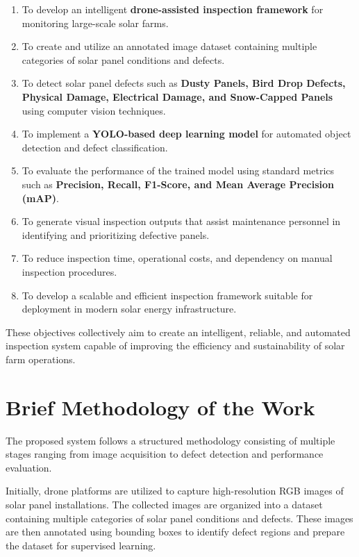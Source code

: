\begin{enumerate}
\item To develop an intelligent \textbf{drone-assisted inspection framework} for monitoring large-scale solar farms.

\item To create and utilize an annotated image dataset containing multiple categories of solar panel conditions and defects.

\item To detect solar panel defects such as \textbf{Dusty Panels, Bird Drop Defects, Physical Damage, Electrical Damage, and Snow-Capped Panels} using computer vision techniques.

\item To implement a \textbf{YOLO-based deep learning model} for automated object detection and defect classification.

\item To evaluate the performance of the trained model using standard metrics such as \textbf{Precision, Recall, F1-Score, and Mean Average Precision (mAP)}.

\item To generate visual inspection outputs that assist maintenance personnel in identifying and prioritizing defective panels.

\item To reduce inspection time, operational costs, and dependency on manual inspection procedures.

\item To develop a scalable and efficient inspection framework suitable for deployment in modern solar energy infrastructure.
\end{enumerate}

These objectives collectively aim to create an intelligent, reliable, and automated inspection system capable of improving the efficiency and sustainability of solar farm operations.

\section{Brief Methodology of the Work}

The proposed system follows a structured methodology consisting of multiple stages ranging from image acquisition to defect detection and performance evaluation.

Initially, drone platforms are utilized to capture high-resolution RGB images of solar panel installations. The collected images are organized into a dataset containing multiple categories of solar panel conditions and defects. These images are then annotated using bounding boxes to identify defect regions and prepare the dataset for supervised learning.

